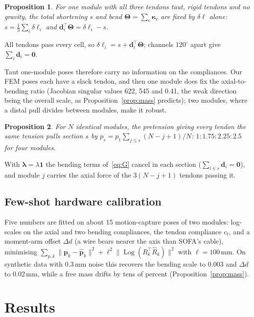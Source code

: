 \documentclass[conference]{IEEEtran}
\newtheorem{proposition}{Proposition}
\newcommand{\dl}{\delta\bm{\ell}}
\newcommand{\lam}{\bm{\lambda}}
\begin{document}
\begin{proposition}\label{prop:one}
For one module with all three tendons taut, rigid tendons and no gravity, the total shortening $s$ and bend
$\bm\Theta=\sum_c\bm\kappa_c$ are fixed by $\dl$ alone: $s=\frac13\sum_i\delta\ell_i$ and $\bm d_i^\top\bm\Theta=\delta\ell_i-s$.
\end{proposition}
\begin{IEEEproof}
All tendons pass every cell, so $\delta\ell_i=s+\bm d_i^\top\bm\Theta$; channels $120^\circ$ apart give
$\sum_i\bm d_i=\bm0$.
\end{IEEEproof}
Taut one-module poses therefore carry no information on the compliances. Our FEM poses each have a slack tendon, and
then one module does fix the axial-to-bending ratio (Jacobian singular values 622, 545 and 0.41, the weak direction being
the overall scale, as Proposition~\ref{prop:mass} predicts); two modules, where a distal pull divides between modules,
make it robust.

\begin{proposition}\label{prop:pre}
For $N$ identical modules, the pretension giving every tendon the same tension pulls section $s$ by
$p_s=p_1\sum_{j\le s}(N-j+1)/N$: $1:1.75:2.25:2.5$ for four modules.
\end{proposition}
\begin{IEEEproof}
With $\lam=\lambda\bm1$ the bending terms of~\eqref{eq:G} cancel in each section ($\sum_{i\in s}\bm d_i=\bm0$), and
module $j$ carries the axial force of the $3(N-j+1)$ tendons passing it.
\end{IEEEproof}

\subsection{Few-shot hardware calibration}
Five numbers are fitted on about 15 motion-capture poses of two modules: log-scales on the axial and two bending compliances, the tendon compliance $c_t$, and a moment-arm offset
$\Delta d$ (a wire bears nearer the axis than SOFA's cable), minimising
$\sum_{p,k}\lVert\bm p_k-\hat{\bm p}_k\rVert^2+\ell^2\lVert\operatorname{Log}(R_k^\top\hat R_k)\rVert^2$ with $\ell=100$\,mm.
On synthetic data with 0.3\,mm noise this recovers the bending scale to 0.003 and $\Delta d$ to 0.02\,mm, while a free
mass drifts by tens of percent (Proposition~\ref{prop:mass}).

\section{Results}\label{sec:results}
\end{document}
